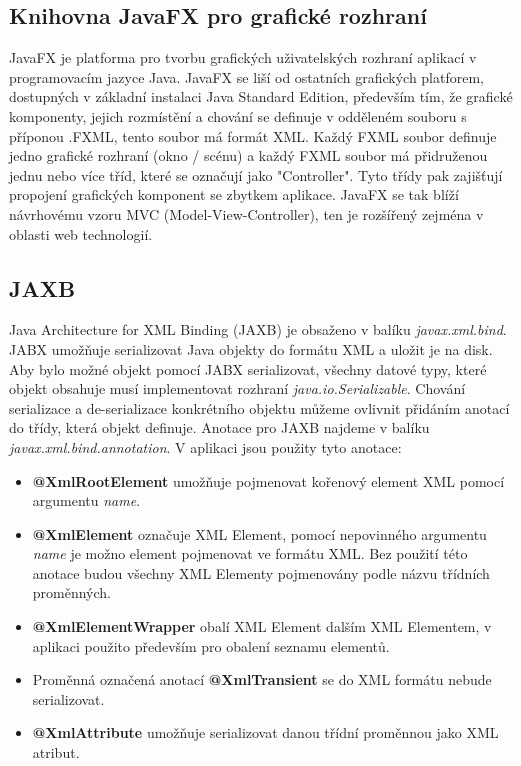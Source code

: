 \documentclass[czech,bachelor,public,dept460,male,cpdeclaration,twoside]{diploma}
\begin{document}
\subsection{Knihovna JavaFX pro grafické rozhraní}
JavaFX je platforma pro tvorbu grafických uživatelských rozhraní aplikací v programovacím jazyce Java. JavaFX se liší od ostatních grafických platforem, dostupných v základní instalaci Java Standard Edition, především tím, že grafické komponenty, jejich rozmístění a chování se definuje v odděleném souboru s příponou .FXML, tento soubor má formát XML. Každý FXML soubor definuje jedno grafické rozhraní (okno / scénu) a každý FXML soubor má přidruženou jednu nebo více tříd, které se označují jako "Controller". Tyto třídy pak zajišťují propojení grafických komponent se zbytkem aplikace. JavaFX se tak blíží návrhovému vzoru MVC (Model-View-Controller), ten je rozšířený zejména v oblasti web technologií.

\subsection{JAXB} \label{jabx}
Java Architecture for XML Binding (JAXB) je obsaženo v balíku \textit{javax.xml.bind}. JABX umožňuje serializovat Java objekty do formátu XML a uložit je na disk. Aby bylo možné objekt pomocí JABX serializovat, všechny datové typy, které objekt obsahuje musí implementovat rozhraní \textit{java.io.Serializable}. Chování serializace a de-serializace konkrétního objektu můžeme ovlivnit přidáním anotací do třídy, která objekt definuje. Anotace pro JAXB najdeme v balíku \textit{javax.xml.bind.annotation}. V aplikaci jsou použity tyto anotace:
\begin{itemize}
  	\item \textbf{@XmlRootElement} umožňuje pojmenovat kořenový element XML pomocí argumentu \textit{name}.
  	\item \textbf{@XmlElement} označuje XML Element, pomocí nepovinného argumentu \textit{name} je možno element pojmenovat ve formátu XML. Bez použití této anotace budou všechny XML Elementy pojmenovány podle názvu třídních proměnných.
  	\item \textbf{@XmlElementWrapper} obalí XML Element dalším XML Elementem, v aplikaci použito především pro obalení seznamu elementů.
  	\item Proměnná označená anotací \textbf{@XmlTransient} se do XML formátu nebude serializovat.
  	\item \textbf{@XmlAttribute} umožňuje serializovat danou třídní proměnnou jako XML atribut.
\end{itemize}
\end{document}
